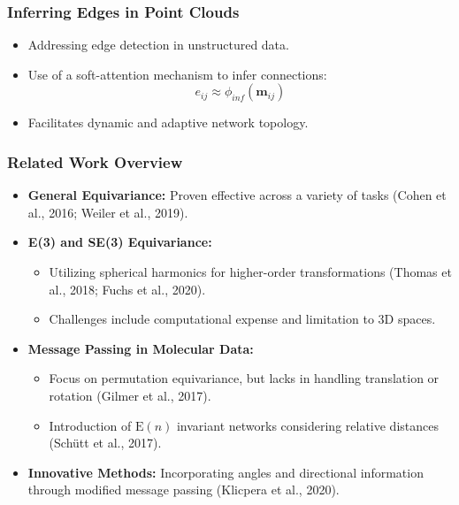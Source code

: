 \documentclass[11pt,xcolor={dvipsnames},hyperref={pdftex,pdfpagemode=UseNone,hidelinks,pdfdisplaydoctitle=true},usepdftitle=false]{beamer}
\newcommand{\rmm}{\mathbf{m}}
\newcommand{\En}{\mathrm{E}(n)}
\begin{document}
\begin{frame}
\frametitle{Inferring Edges in Point Clouds}
\begin{itemize}
      \item Addressing edge detection in unstructured data.
      \item Use of a soft-attention mechanism to infer connections:
    \begin{equation}
    e_{ij} \approx \phi_{inf}(\rmm_{ij})
    \end{equation}
      \item Facilitates dynamic and adaptive network topology.
\end{itemize}
\end{frame}
    
\begin{frame}
\frametitle{Related Work Overview}
\begin{itemize}
    \item \textbf{General Equivariance:} Proven effective across a variety of tasks (Cohen et al., 2016; Weiler et al., 2019).
    \item \textbf{E(3) and SE(3) Equivariance:}
    \begin{itemize}
    \item Utilizing spherical harmonics for higher-order transformations (Thomas et al., 2018; Fuchs et al., 2020).
    \item Challenges include computational expense and limitation to 3D spaces.
    \end{itemize}
    \item \textbf{Message Passing in Molecular Data:}
    \begin{itemize}
    \item Focus on permutation equivariance, but lacks in handling translation or rotation (Gilmer et al., 2017).
    \item Introduction of $\En$ invariant networks considering relative distances (Schütt et al., 2017).
    \end{itemize}
    \item \textbf{Innovative Methods:} Incorporating angles and directional information through modified message passing (Klicpera et al., 2020).
\end{itemize}
\end{frame}
\end{document}
